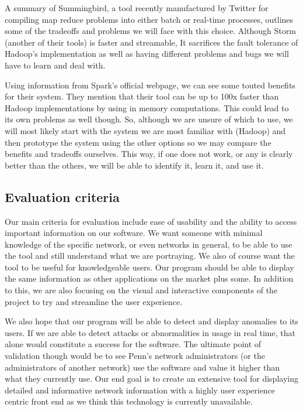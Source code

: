\documentclass{sig-alternate}
\begin{document}
A summary of Summingbird, a tool recently manufactured by Twitter for compiling
map reduce problems into either batch or real-time processes, outlines some of
the tradeoffs and problems we will face with this choice. Although Storm
(another of their tools) is faster and streamable, It sacrifices the fault
tolerance of Hadoop's implementation as well as having different problems and
bugs we will have to learn and deal with.\cite{TwitterSummingbird}

Using information from Spark's official webpage\cite{ApacheSpark}, we can see
some touted benefits for their system. They mention that their tool can be up to
100x faster than Hadoop implementations by using in memory computations. This
could lead to its own problems as well though. So, although we are unsure of
which to use, we will most likely start with the system we are most familiar
with (Hadoop) and then prototype the system using the other options so we may
compare the benefits and tradeoffs ourselves. This way, if one does not work, or
any is clearly better than the others, we will be able to identify it, learn it,
and use it.

\subsection{Evaluation criteria}

Our main criteria for evaluation include ease of usability and the ability to
access important information on our software. We want someone with minimal
knowledge of the specific network, or even networks in general, to be able to
use the tool and still understand what we are portraying. We also of course want
the tool to be useful for knowledgeable users. Our program should be able to
display the same information as other applications on the market plus some. In
addition to this, we are also focusing on the visual and interactive components
of the project to try and streamline the user experience.

We also hope that our program will be able to detect and display anomalies to
its users. If we are able to detect attacks or abnormalities in usage in real
time, that alone would constitute a success for the software. The ultimate point
of validation though would be to see Penn’s network administrators (or the
administrators of another network) use the software and value it higher than
what they currently use. Our end goal is to create an extensive tool for
displaying detailed and informative network information with a highly user
experience centric front end as we think this technology is currently
unavailable.
\end{document}
